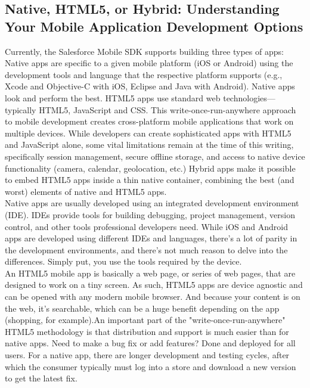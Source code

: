 \subsection{Native, HTML5, or Hybrid: Understanding Your Mobile Application Development Options}
Currently, the Salesforce Mobile SDK supports building three types of apps:
Native apps are specific to a given mobile platform (iOS or Android) using the development tools and language that the respective platform supports (e.g., Xcode and Objective-C with iOS, Eclipse and Java with Android). Native apps look and perform the best.
HTML5 apps use standard web technologies—typically HTML5, JavaScript and CSS. This write-once-run-anywhere approach to mobile development creates cross-platform mobile applications that work on multiple devices. While developers can create sophisticated apps with HTML5 and JavaScript alone, some vital limitations remain at the time of this writing, specifically session management, secure offline storage, and access to native device functionality (camera, calendar, geolocation, etc.)
Hybrid apps make it possible to embed HTML5 apps inside a thin native container, combining the best (and worst) elements of native and HTML5 apps.\\
Native apps are usually developed using an integrated development environment (IDE). IDEs provide tools for building debugging, project management, version control, and other tools professional developers need. While iOS and Android apps are developed using different IDEs and languages, there’s a lot of parity in the development environments, and there’s not much reason to delve into the differences. Simply put, you use the tools required by the device.\\
An HTML5 mobile app is basically a web page, or series of web pages, that are designed to work on a tiny screen. As such, HTML5 apps are device agnostic and can be opened with any modern mobile browser. And because your content is on the web, it's searchable, which can be a huge benefit depending on the app (shopping, for example).An important part of the "write-once-run-anywhere" HTML5 methodology is that distribution and support is much easier than for native apps. Need to make a bug fix or add features? Done and deployed for all users. For a native app, there are longer development and testing cycles, after which the consumer typically must log into a store and download a new version to get the latest fix.
